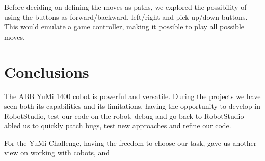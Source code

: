 \documentclass[a4paper,12pt]{article}
\begin{document}
Before deciding on defining the moves as paths, we explored the possibility of using the buttons as forward/backward, left/right and pick up/down buttons. This would emulate a game controller, making it possible to play all possible moves.  


\section{Conclusions} 
The ABB YuMi 1400 cobot is powerful and versatile. During the projects we have seen both its capabilities and its limitations. 
having the opportunity  to develop in RobotStudio, test our code on the robot, debug and go back to RobotStudio abled us to quickly patch bugs, test new approaches and refine our code. 

For the YuMi Challenge, having the freedom to choose our task, gave us another view on working with cobots, and
\end{document}
